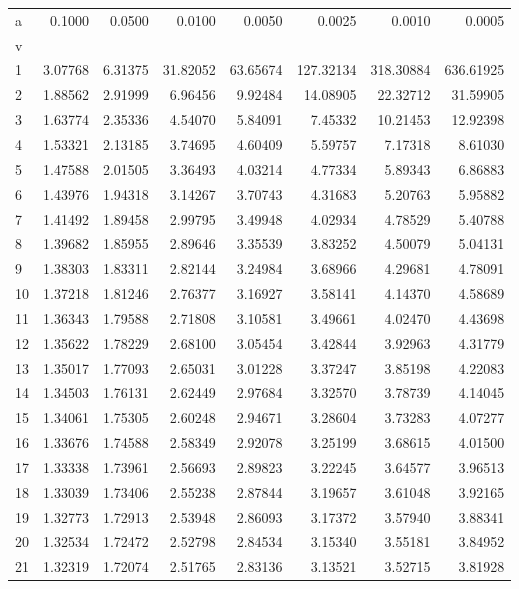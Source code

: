 \begin{tabular}{lrrrrrrr}
a & 0.1000 & 0.0500 & 0.0100 & 0.0050 & 0.0025 & 0.0010 & 0.0005 \\
v &  &  &  &  &  &  &  \\
1 & 3.07768 & 6.31375 & 31.82052 & 63.65674 & 127.32134 & 318.30884 & 636.61925 \\
2 & 1.88562 & 2.91999 & 6.96456 & 9.92484 & 14.08905 & 22.32712 & 31.59905 \\
3 & 1.63774 & 2.35336 & 4.54070 & 5.84091 & 7.45332 & 10.21453 & 12.92398 \\
4 & 1.53321 & 2.13185 & 3.74695 & 4.60409 & 5.59757 & 7.17318 & 8.61030 \\
5 & 1.47588 & 2.01505 & 3.36493 & 4.03214 & 4.77334 & 5.89343 & 6.86883 \\
6 & 1.43976 & 1.94318 & 3.14267 & 3.70743 & 4.31683 & 5.20763 & 5.95882 \\
7 & 1.41492 & 1.89458 & 2.99795 & 3.49948 & 4.02934 & 4.78529 & 5.40788 \\
8 & 1.39682 & 1.85955 & 2.89646 & 3.35539 & 3.83252 & 4.50079 & 5.04131 \\
9 & 1.38303 & 1.83311 & 2.82144 & 3.24984 & 3.68966 & 4.29681 & 4.78091 \\
10 & 1.37218 & 1.81246 & 2.76377 & 3.16927 & 3.58141 & 4.14370 & 4.58689 \\
11 & 1.36343 & 1.79588 & 2.71808 & 3.10581 & 3.49661 & 4.02470 & 4.43698 \\
12 & 1.35622 & 1.78229 & 2.68100 & 3.05454 & 3.42844 & 3.92963 & 4.31779 \\
13 & 1.35017 & 1.77093 & 2.65031 & 3.01228 & 3.37247 & 3.85198 & 4.22083 \\
14 & 1.34503 & 1.76131 & 2.62449 & 2.97684 & 3.32570 & 3.78739 & 4.14045 \\
15 & 1.34061 & 1.75305 & 2.60248 & 2.94671 & 3.28604 & 3.73283 & 4.07277 \\
16 & 1.33676 & 1.74588 & 2.58349 & 2.92078 & 3.25199 & 3.68615 & 4.01500 \\
17 & 1.33338 & 1.73961 & 2.56693 & 2.89823 & 3.22245 & 3.64577 & 3.96513 \\
18 & 1.33039 & 1.73406 & 2.55238 & 2.87844 & 3.19657 & 3.61048 & 3.92165 \\
19 & 1.32773 & 1.72913 & 2.53948 & 2.86093 & 3.17372 & 3.57940 & 3.88341 \\
20 & 1.32534 & 1.72472 & 2.52798 & 2.84534 & 3.15340 & 3.55181 & 3.84952 \\
21 & 1.32319 & 1.72074 & 2.51765 & 2.83136 & 3.13521 & 3.52715 & 3.81928 \\

\end{tabular}
